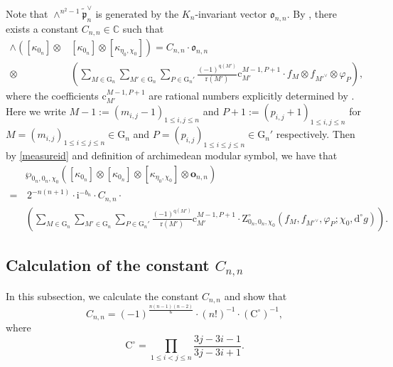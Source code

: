 \documentclass[12pt, a4paper]{amsart}
\newcommand{\RC}{{\mathrm {C}}}
\newcommand{\RG}{{\mathrm {G}}}
\newcommand{\RZ}{{\mathrm {Z}}}
\newcommand{\C}{\mathbb{C}}
\theoremstyle{Theorem}
\theoremstyle{Theorem}
\theoremstyle{Theorem}
\theoremstyle{Theorem}
\theoremstyle{Plain}
\theoremstyle{Definition}
\begin{document}
	Note that $\wedge^{n^2-1}\widetilde{\mathfrak{p}}_n^{\vee}$ is generated by the $K_n$-invariant vector $\mathfrak{o}_{n,n}$. By \cite[Lemma 4.3]{IM}, there exists a constant $C_{n,n}\in\C$ such that
	\begin{equation}\label{cnn}
		\begin{aligned}
			\wedge\left([\kappa_{0_n}]\otimes\right.&\left.[\kappa_{0_n}]\otimes[\kappa_{\eta_0,\chi_0}]\right)=C_{n,n}\cdot\mathfrak{o}_{n,n}\\
			\otimes&\left(\sum_{M\in\RG_n}\sum_{M'\in\RG_n}\sum_{P\in\RG_n'}\frac{(-1)^{\mathrm{q}(M')}}{\mathrm{r}(M')}\mathrm{c}_{M'}^{M-1,P+1}\cdot f_M\otimes f_{M'^{\vee}}\otimes\varphi_{P}\right),
		\end{aligned}
	\end{equation}
	where the coefficients $\mathrm{c}_{M'}^{M-1,P+1}$ are rational numbers explicitly determined by \cite[Proposition 2.13]{IM}. Here we write $M-1:=(m_{i,j}-1)_{1\leq i,j\leq n}$ and $P+1:=(p_{i,j}+1)_{1\leq i,j\leq n}$ for $M=(m_{i,j})_{1\leq i\leq j\leq n}\in\RG_n$ and $P=(p_{i,j})_{1\leq i\leq j\leq n}\in\RG_n'$ respectively. Then by \eqref{measureid} and definition of archimedean modular symbol, we have that
	\begin{equation}\label{reduction}
		\begin{aligned}
			&\wp_{0_n,0_n,\chi_0}\left([\kappa_{0_n}]\otimes[\kappa_{0_n}]\otimes[\kappa_{\eta_0,\chi_0}]\otimes\mathbf{o}_{n,n}\right)\\
			=&\,2^{-n(n+1)}\cdot\mathrm{i}^{-b_n}\cdot C_{n,n}\cdot\\
			&\left(\sum_{M\in\RG_n}\sum_{M'\in\RG_n}\sum_{P\in\RG_n'}\frac{(-1)^{\mathrm{q}(M')}}{\mathrm{r}(M')}\mathrm{c}_{M'}^{M-1,P+1}\cdot\RZ^{\circ}_{0_n,0_n,\chi_0}\left(f_M,f_{M'^{\vee}},\varphi_P;\chi_0,\mathrm{d}^{\circ}g\right)\right).
		\end{aligned}
	\end{equation}
	
	
	\subsection{Calculation of the constant $C_{n,n}$}\label{sec:4.3}
	
	In this subsection, we calculate the constant $C_{n,n}$ and show that
	\begin{equation}
		\label{CNN}
		C_{n,n}=(-1)^{\frac{n(n-1)(n-2)}{6}}\cdot(n!)^{-1}\cdot(\RC^{\circ})^{-1},
	\end{equation}
	where
	\[
	\RC^{\circ}=\prod_{1\leq i<j\leq n}\frac{3j-3i-1}{3j-3i+1}.
	\]
	
\end{document}
